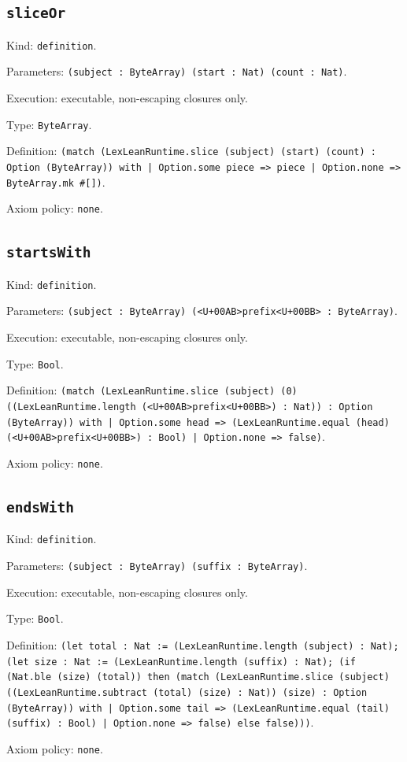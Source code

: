\documentclass[11pt]{article}
\begin{document}
\subsection*{\texttt{sliceOr}}
\noindent Kind: \texttt{definition}.\par
\noindent Parameters: \texttt{(subject : ByteArray) (start : Nat) (count : Nat)}.\par
\noindent Execution: executable, non-escaping closures only.\par
\noindent Type: \texttt{ByteArray}.\par
\noindent Definition: \texttt{(match (LexLeanRuntime.slice (subject) (start) (count) : Option (ByteArray)) with | Option.some piece => piece | Option.none => ByteArray.mk \#[])}.\par
\noindent Axiom policy: \texttt{none}.\par
\subsection*{\texttt{startsWith}}
\noindent Kind: \texttt{definition}.\par
\noindent Parameters: \texttt{(subject : ByteArray) (<U+00AB>prefix<U+00BB> : ByteArray)}.\par
\noindent Execution: executable, non-escaping closures only.\par
\noindent Type: \texttt{Bool}.\par
\noindent Definition: \texttt{(match (LexLeanRuntime.slice (subject) (0) ((LexLeanRuntime.length (<U+00AB>prefix<U+00BB>) : Nat)) : Option (ByteArray)) with | Option.some head => (LexLeanRuntime.equal (head) (<U+00AB>prefix<U+00BB>) : Bool) | Option.none => false)}.\par
\noindent Axiom policy: \texttt{none}.\par
\subsection*{\texttt{endsWith}}
\noindent Kind: \texttt{definition}.\par
\noindent Parameters: \texttt{(subject : ByteArray) (suffix : ByteArray)}.\par
\noindent Execution: executable, non-escaping closures only.\par
\noindent Type: \texttt{Bool}.\par
\noindent Definition: \texttt{(let total : Nat := (LexLeanRuntime.length (subject) : Nat); (let size : Nat := (LexLeanRuntime.length (suffix) : Nat); (if (Nat.ble (size) (total)) then (match (LexLeanRuntime.slice (subject) ((LexLeanRuntime.subtract (total) (size) : Nat)) (size) : Option (ByteArray)) with | Option.some tail => (LexLeanRuntime.equal (tail) (suffix) : Bool) | Option.none => false) else false)))}.\par
\noindent Axiom policy: \texttt{none}.\par
\end{document}
